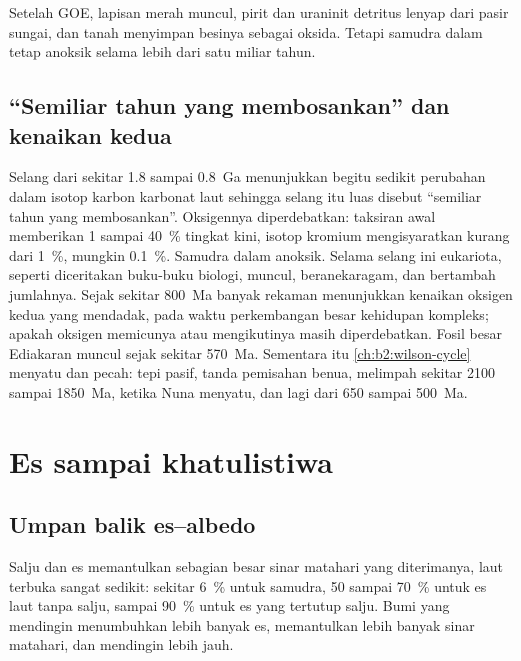Setelah GOE, lapisan merah muncul, pirit dan uraninit detritus lenyap dari pasir sungai,
dan tanah menyimpan besinya sebagai oksida. Tetapi samudra dalam tetap anoksik selama lebih dari satu miliar
tahun.

\subsection*{``Semiliar tahun yang membosankan'' dan kenaikan kedua}

Selang dari sekitar 1.8 sampai \qty{0.8}{Ga} menunjukkan begitu sedikit perubahan dalam isotop karbon
karbonat laut sehingga selang itu luas disebut ``semiliar tahun yang membosankan''. Oksigennya diperdebatkan: taksiran
awal memberikan 1 sampai \qty{40}{\percent} tingkat kini, isotop kromium mengisyaratkan kurang dari
\qty{1}{\percent}, mungkin \qty{0.1}{\percent}. Samudra dalam anoksik. Selama selang ini
eukariota, seperti diceritakan buku-buku biologi, muncul, beranekaragam, dan bertambah jumlahnya. Sejak sekitar \qty{800}{Ma} banyak rekaman menunjukkan
kenaikan oksigen kedua yang mendadak, pada waktu perkembangan besar kehidupan kompleks; apakah
oksigen memicunya atau mengikutinya masih diperdebatkan. Fosil besar Ediakaran
muncul sejak sekitar \qty{570}{Ma}. Sementara itu  \cref{ch:b2:wilson-cycle}
menyatu dan pecah: tepi pasif, tanda pemisahan benua, melimpah sekitar 2100 sampai
\qty{1850}{Ma}, ketika Nuna menyatu, dan lagi dari 650 sampai \qty{500}{Ma}.

\section{Es sampai khatulistiwa}\label{sec:b2:precambrian-earth:snowball}

\subsection*{Umpan balik es--albedo}

Salju dan es memantulkan sebagian besar sinar matahari yang diterimanya, laut terbuka sangat sedikit: sekitar
\qty{6}{\percent} untuk samudra, 50 sampai \qty{70}{\percent} untuk es laut tanpa salju, sampai
\qty{90}{\percent} untuk es yang tertutup salju. Bumi yang mendingin menumbuhkan lebih banyak es, memantulkan lebih banyak
sinar matahari, dan mendingin lebih jauh.

